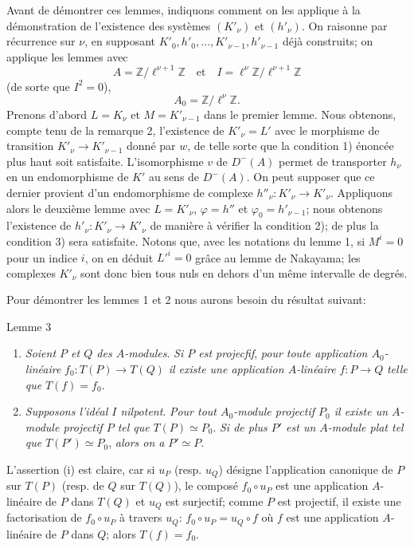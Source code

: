 Avant de démontrer ces lemmes, indiquons comment on les applique à la démonstration de l'existence des systèmes $(K'_\nu)$ et $(h'_\nu)$. On raisonne par récurrence sur $\nu$, en supposant $K'_0,h'_0,\ldots,K'_{\nu-1},h'_{\nu-1}$ déjà construits; on applique les lemmes avec
\[
A=\mathbb{Z}/\ell^{\nu+1}\mathbb{Z}
\quad\text{et}\quad
I=\ell^\nu\mathbb{Z}/\ell^{\nu+1}\mathbb{Z}
\]
(de sorte que $I^2=0$),
\[
A_0=\mathbb{Z}/\ell^\nu\mathbb{Z}.
\]
Prenons d'abord $L=K_\nu$ et $M=K'_{\nu-1}$ dans le premier lemme. Nous obtenons, compte tenu de la remarque 2, l'existence de $K'_\nu=L'$ avec le morphisme de transition $K'_\nu\to K'_{\nu-1}$ donné par $w$, de telle sorte que la condition 1) énoncée plus haut soit satisfaite. L'isomorphisme $v$ de $D^-(A)$ permet de transporter $h_\nu$ en un endomorphisme de $K'$ au sens de $D^-(A)$. On peut supposer que ce dernier provient d'un endomorphisme de complexe $h''_\nu:K'_\nu\to K'_\nu$. Appliquons alors le deuxième lemme avec $L=K'_\nu$, 
$\varphi=h''$ et $\varphi_0=h'_{\nu-1}$;
nous obtenons l'existence de $h'_\nu:K'_\nu\to K'_\nu$ de manière à vérifier la condition 2); de plus la condition 3) sera satisfaite. Notons que, avec les notations du lemme 1, si $M^i=0$ pour un indice $i$, on en déduit $L'^i=0$ grâce au lemme de Nakayama; les complexes $K'_\nu$ sont donc bien tous nuls en dehors d'un même intervalle de degrés.

Pour démontrer les lemmes 1 et 2 nous aurons besoin du résultat suivant:

\begin{statement}{Lemme 3}
\begin{enumerate}[label=(\roman*)]
\item \emph{Soient $P$ et $Q$ des $A$-modules}. \emph{Si $P$ est projecfif}, \emph{pour toute application $A_0$-linéaire} $f_0:T(P)\to T(Q)$ \emph{il existe une application $A$-linéaire} $f:P\to Q$ \emph{telle que} $T(f)=f_0$.
\item \emph{Supposons l'idéal $I$ nilpotent}. \emph{Pour tout $A_0$-module projectif $P_0$ il existe un $A$-module projectif $P$ tel que} $T(P)\simeq P_0$. \emph{Si de plus $P'$ est un $A$-module plat tel que} $T(P')\simeq P_0$, \emph{alors on a} $P'\simeq P$.
\end{enumerate}
\end{statement}

L'assertion (i) est claire, car si $u_P$ (resp. $u_Q$) désigne l'application canonique de $P$ sur $T(P)$ (resp. de $Q$ sur $T(Q)$), le composé $f_0\circ u_P$ est une application $A$-linéaire de $P$ dans $T(Q)$ et $u_Q$ est surjectif; comme $P$ est projectif, il existe une factorisation de $f_0\circ u_P$ à travers $u_Q$: $f_0\circ u_P=u_Q\circ f$ où $f$ est une application $A$-linéaire de $P$ dans $Q$; alors $T(f)=f_0$.

